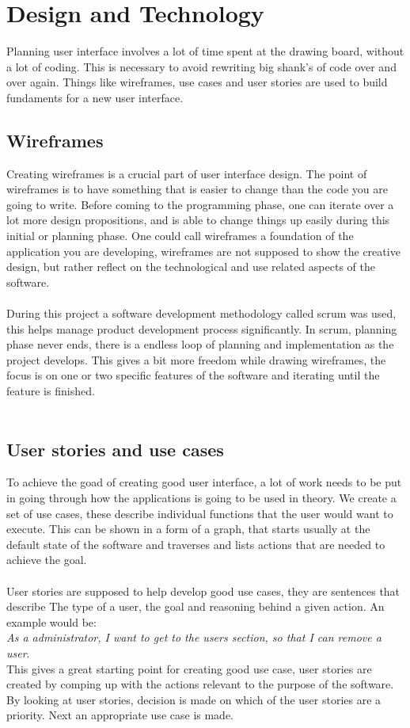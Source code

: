 \chapter{Design and Technology}
Planning user interface involves a lot of time spent at the drawing board, without a lot of coding. This is necessary to avoid rewriting big shank's of code over and over again. Things like wireframes, use cases and user stories are used to build fundaments for a new user interface.
\section{Wireframes}\label{wireframes}
Creating wireframes is a crucial part of user interface design. The point of wireframes is to have something that is easier to change than the code you are going to write. Before coming to the programming phase, one can iterate over a lot more design propositions, and is able to change things up easily during this initial or planning phase. One could call wireframes a foundation of the application you are developing, wireframes are not supposed to show the creative design, but rather reflect on the technological and use related aspects of the software.\\\\
During this project a software development methodology called scrum was used, this helps manage product development process significantly. In scrum, planning phase never ends, there is a endless loop of planning and implementation as the project develops. This gives a bit more freedom while drawing wireframes, the focus is on one or two specific features of the software and iterating until the feature is finished.\\\\
\section{User stories and use cases}\label{userStoriesAndUseCases}
To achieve the goad of creating good user interface, a lot of work needs to be put in going through how the applications is going to be used in theory. We create a set of use cases, these describe individual functions that the user would want to execute. This can be shown in a form of a graph, that starts usually at the default state of the software and traverses and lists actions that are needed to achieve the goal.\\\\
User stories are supposed to help develop good use cases, they are sentences that describe The type of a user, the goal and reasoning behind a given action. An example would be:\\\emph{As a administrator, I want to get to the users section, so that I can remove a user}.\\
This gives a great starting point for creating good use case, user stories are created by comping up with the actions relevant to the purpose of the software. By looking at user stories, decision is made on which of the user stories are a priority. Next an appropriate use case is made.
